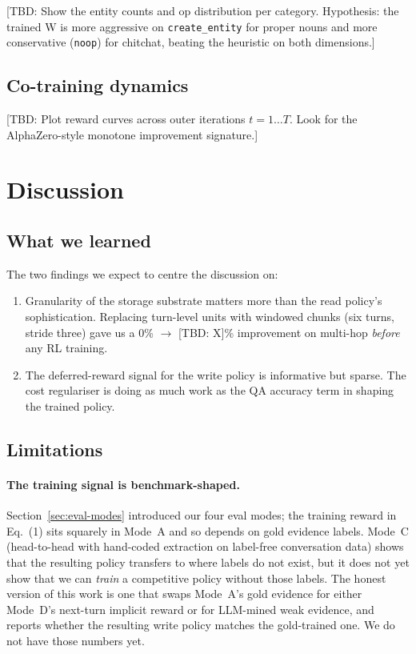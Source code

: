 \documentclass[11pt]{article}
\newcommand{\TBD}[1]{%
  \textcolor{red!80!black}{\textsf{[TBD: #1]}}}
\begin{document}
\TBD{Show the entity counts and op distribution per category. Hypothesis:
the trained W is more aggressive on \texttt{create\_entity} for proper
nouns and more conservative (\texttt{noop}) for chitchat, beating the
heuristic on both dimensions.}

\subsection{Co-training dynamics}

\TBD{Plot reward curves across outer iterations $t=1\ldots T$. Look for
the AlphaZero-style monotone improvement signature.}

\section{Discussion}
\label{sec:discussion}

\subsection{What we learned}

The two findings we expect to centre the discussion on:
\begin{enumerate}
  \item Granularity of the storage substrate matters more than the read
    policy's sophistication. Replacing turn-level units with windowed
    chunks (six turns, stride three) gave us a 0\% $\to$ \TBD{X}\%
    improvement on multi-hop \emph{before} any RL training.
  \item The deferred-reward signal for the write policy is informative
    but sparse. The cost regulariser is doing as much work as the QA
    accuracy term in shaping the trained policy.
\end{enumerate}

\subsection{Limitations}

\paragraph{The training signal is benchmark-shaped.}
Section~\ref{sec:eval-modes} introduced our four eval modes; the
training reward in Eq.~(1) sits squarely in Mode~A and so depends on
gold evidence labels. Mode~C (head-to-head with hand-coded extraction
on label-free conversation data) shows that the resulting policy
transfers to where labels do not exist, but it does not yet show that
we can \emph{train} a competitive policy without those labels. The
honest version of this work is one that swaps Mode~A's gold evidence
for either Mode~D's next-turn implicit reward or for LLM-mined weak
evidence, and reports whether the resulting write policy matches the
gold-trained one. We do not have those numbers yet.
\end{document}
